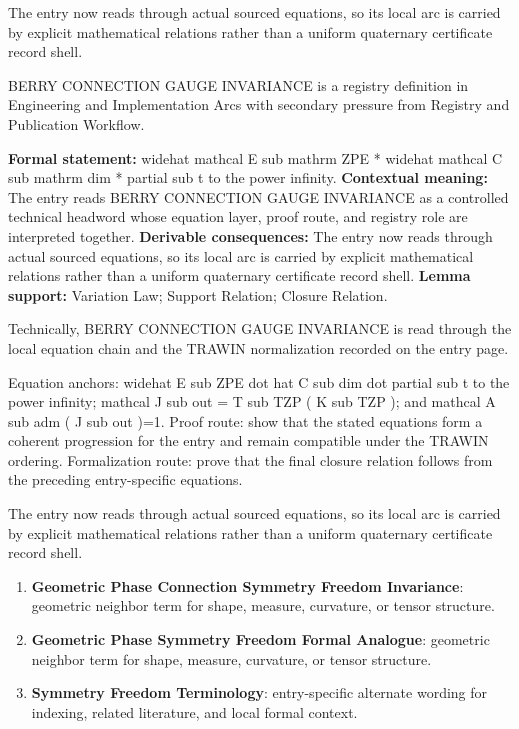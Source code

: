 The entry now reads through actual sourced equations, so its local arc is carried by explicit mathematical relations rather than a uniform quaternary certificate record shell.
\clearpage


\begingroup\small
{}
BERRY CONNECTION GAUGE INVARIANCE is a registry definition in Engineering and Implementation Arcs with secondary pressure from Registry and Publication Workflow.

\begingroup\footnotesize\setlength{\emergencystretch}{3em}\sloppy
\textbf{Formal statement:} widehat mathcal E sub mathrm ZPE * widehat mathcal C sub mathrm dim * partial sub t to the power infinity. \textbf{Contextual meaning:} The entry reads BERRY CONNECTION GAUGE INVARIANCE as a controlled technical headword whose equation layer, proof route, and registry role are interpreted together. \textbf{Derivable consequences:} The entry now reads through actual sourced equations, so its local arc is carried by explicit mathematical relations rather than a uniform quaternary certificate record shell. \textbf{Lemma support:} Variation Law; Support Relation; Closure Relation.\par
\endgroup

Technically, BERRY CONNECTION GAUGE INVARIANCE is read through the local equation chain and the TRAWIN normalization recorded on the entry page.

Equation anchors: widehat E sub ZPE dot hat C sub dim dot partial sub t to the power infinity; mathcal J sub out = T sub TZP ( K sub TZP ); and mathcal A sub adm ( J sub out )=1. Proof route: show that the stated equations form a coherent progression for the entry and remain compatible under the TRAWIN ordering. Formalization route: prove that the final closure relation follows from the preceding entry-specific equations.

The entry now reads through actual sourced equations, so its local arc is carried by explicit mathematical relations rather than a uniform quaternary certificate record shell.
\endgroup

\begin{enumerate}[leftmargin=1.6em,itemsep=6pt,topsep=4pt]
\item \textbf{Geometric Phase Connection Symmetry Freedom Invariance}: geometric neighbor term for shape, measure, curvature, or tensor structure.
\item \textbf{Geometric Phase Symmetry Freedom Formal Analogue}: geometric neighbor term for shape, measure, curvature, or tensor structure.
\item \textbf{Symmetry Freedom Terminology}: entry-specific alternate wording for indexing, related literature, and local formal context.
\end{enumerate}


